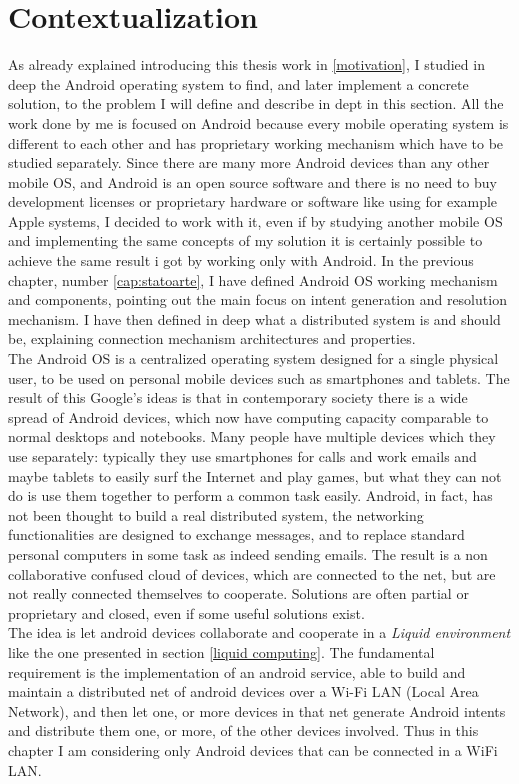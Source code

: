 \section{Contextualization} \label{facedProblem}
As already explained introducing this thesis work in \ref{motivation}, I studied in deep the Android operating system to find, and later implement a concrete solution, to the problem I will define and describe in dept in this section. All the work done by me is focused on Android because every mobile operating system is different to each other and has proprietary working mechanism which have to be studied separately. Since there are many more Android devices than any other mobile OS, and Android is an open source software and there is no need to buy development licenses or proprietary hardware or software like using for example Apple systems, I decided to work with it, even if by studying another mobile OS and implementing the same concepts of my solution it is certainly possible to achieve the same result i got by working only with Android. 
In the previous chapter, number \ref{cap:statoarte}, I have defined Android OS working mechanism and components, pointing out the main focus on intent generation and resolution mechanism. I have then defined in deep what a distributed system is and should be, explaining connection mechanism architectures and properties.\\ 
The Android OS is a centralized operating system designed for a single physical user, to be used on personal mobile devices such as smartphones and tablets. The result of this Google's ideas is that in contemporary society there is a wide spread of Android devices, which now have computing capacity comparable to normal desktops and notebooks. Many people have multiple devices which they use separately: typically they use smartphones for calls and  work emails and maybe tablets to easily surf the Internet and play games, but what they can not do is use them together to perform a common task easily. Android, in fact, has not been thought to build a real distributed system, the networking functionalities are designed to exchange messages, and to replace standard personal computers in some task as indeed sending emails.
The result is a non collaborative confused cloud of devices, which are connected to the net, but are not really connected themselves to cooperate. Solutions are often partial or proprietary and closed, even if some useful solutions exist.\\
The idea is let android devices collaborate and cooperate in a \textit{Liquid environment} like the one presented in section \ref{liquid computing}. The fundamental requirement is the implementation of an android service, able to build and maintain a distributed net of android devices over a Wi-Fi LAN (Local Area Network), and then let one, or more devices in that net generate Android intents and distribute them one, or more, of the other devices involved. Thus in this chapter I am considering only Android devices that can be connected in a WiFi LAN.\\
